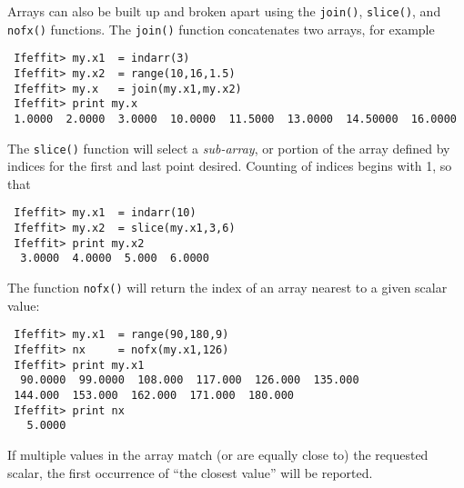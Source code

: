 Arrays can also be built up and broken apart using the {\tt{join()}},
{\tt{slice()}}, and {\tt{nofx()}} functions.  The {\tt{join()}} function
concatenates two arrays, for example
\begin{verbatim}
 Ifeffit> my.x1  = indarr(3)
 Ifeffit> my.x2  = range(10,16,1.5)
 Ifeffit> my.x   = join(my.x1,my.x2)
 Ifeffit> print my.x 
 1.0000  2.0000  3.0000  10.0000  11.5000  13.0000  14.50000  16.0000
\end{verbatim}
\noindent
The {\tt{slice()}} function will select a {\emph{sub-array}}, or portion of
the array defined by indices for the first and last point desired.
Counting of indices begins with 1, so that 
\begin{verbatim}
 Ifeffit> my.x1  = indarr(10)
 Ifeffit> my.x2  = slice(my.x1,3,6)
 Ifeffit> print my.x2
  3.0000  4.0000  5.000  6.0000 
\end{verbatim}
The function {\tt{nofx()}} will return the index of an array nearest to
a given scalar value:
\begin{verbatim}
 Ifeffit> my.x1  = range(90,180,9)
 Ifeffit> nx     = nofx(my.x1,126)
 Ifeffit> print my.x1
  90.0000  99.0000  108.000  117.000  126.000  135.000  
 144.000  153.000  162.000  171.000  180.000
 Ifeffit> print nx
   5.0000
\end{verbatim}
\noindent 
If multiple values in the array match (or are equally close to) the
requested scalar, the first occurrence of ``the closest value'' will be
reported.


